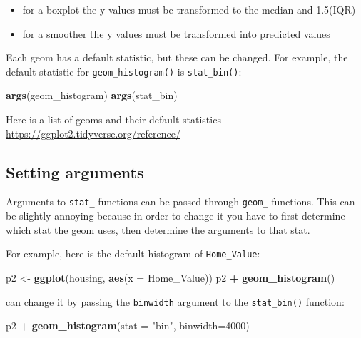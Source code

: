 \documentclass[]{book}
\newenvironment{Shaded}{\begin{snugshade}}{\end{snugshade}}
\newcommand{\KeywordTok}[1]{\textcolor[rgb]{0.13,0.29,0.53}{\textbf{#1}}}
\newcommand{\DataTypeTok}[1]{\textcolor[rgb]{0.13,0.29,0.53}{#1}}
\newcommand{\DecValTok}[1]{\textcolor[rgb]{0.00,0.00,0.81}{#1}}
\newcommand{\StringTok}[1]{\textcolor[rgb]{0.31,0.60,0.02}{#1}}
\newcommand{\OperatorTok}[1]{\textcolor[rgb]{0.81,0.36,0.00}{\textbf{#1}}}
\newcommand{\NormalTok}[1]{#1}
\providecommand{\tightlist}{%
  \setlength{\itemsep}{0pt}\setlength{\parskip}{0pt}}
\begin{document}
\begin{itemize}
\tightlist
\item
  for a boxplot the y values must be transformed to the median and
  1.5(IQR)
\item
  for a smoother the y values must be transformed into predicted values
\end{itemize}

Each geom has a default statistic, but these can be changed. For
example, the default statistic for \texttt{geom\_histogram()} is
\texttt{stat\_bin()}:

\begin{Shaded}
\begin{Highlighting}[]
\KeywordTok{args}\NormalTok{(geom_histogram)}
\KeywordTok{args}\NormalTok{(stat_bin)}
\end{Highlighting}
\end{Shaded}

Here is a list of geoms and their default statistics
\url{https://ggplot2.tidyverse.org/reference/}

\subsection{Setting arguments}\label{setting-arguments}

Arguments to \texttt{stat\_} functions can be passed through
\texttt{geom\_} functions. This can be slightly annoying because in
order to change it you have to first determine which stat the geom uses,
then determine the arguments to that stat.

For example, here is the default histogram of \texttt{Home\_Value}:

\begin{Shaded}
\begin{Highlighting}[]
\NormalTok{p2 <-}\StringTok{ }\KeywordTok{ggplot}\NormalTok{(housing, }\KeywordTok{aes}\NormalTok{(}\DataTypeTok{x =}\NormalTok{ Home_Value))}
\NormalTok{p2 }\OperatorTok{+}\StringTok{ }\KeywordTok{geom_histogram}\NormalTok{()}
\end{Highlighting}
\end{Shaded}

can change it by passing the \texttt{binwidth} argument to the
\texttt{stat\_bin()} function:

\begin{Shaded}
\begin{Highlighting}[]
\NormalTok{p2 }\OperatorTok{+}\StringTok{ }\KeywordTok{geom_histogram}\NormalTok{(}\DataTypeTok{stat =} \StringTok{"bin"}\NormalTok{, }\DataTypeTok{binwidth=}\DecValTok{4000}\NormalTok{)}
\end{Highlighting}
\end{Shaded}
\end{document}
